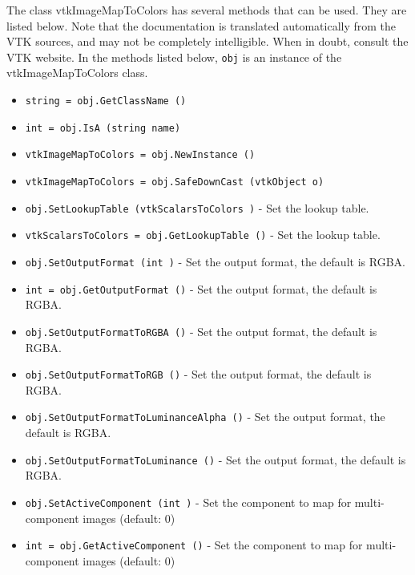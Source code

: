 The class vtkImageMapToColors has several methods that can be used.
  They are listed below.
Note that the documentation is translated automatically from the VTK sources,
and may not be completely intelligible.  When in doubt, consult the VTK website.
In the methods listed below, \verb|obj| is an instance of the vtkImageMapToColors class.
\begin{itemize}
\item  \verb|string = obj.GetClassName ()|

\item  \verb|int = obj.IsA (string name)|

\item  \verb|vtkImageMapToColors = obj.NewInstance ()|

\item  \verb|vtkImageMapToColors = obj.SafeDownCast (vtkObject o)|

\item  \verb|obj.SetLookupTable (vtkScalarsToColors )| -  Set the lookup table.

\item  \verb|vtkScalarsToColors = obj.GetLookupTable ()| -  Set the lookup table.

\item  \verb|obj.SetOutputFormat (int )| -  Set the output format, the default is RGBA.  

\item  \verb|int = obj.GetOutputFormat ()| -  Set the output format, the default is RGBA.  

\item  \verb|obj.SetOutputFormatToRGBA ()| -  Set the output format, the default is RGBA.  

\item  \verb|obj.SetOutputFormatToRGB ()| -  Set the output format, the default is RGBA.  

\item  \verb|obj.SetOutputFormatToLuminanceAlpha ()| -  Set the output format, the default is RGBA.  

\item  \verb|obj.SetOutputFormatToLuminance ()| -  Set the output format, the default is RGBA.  

\item  \verb|obj.SetActiveComponent (int )| -  Set the component to map for multi-component images (default: 0)

\item  \verb|int = obj.GetActiveComponent ()| -  Set the component to map for multi-component images (default: 0)


\end{itemize}
